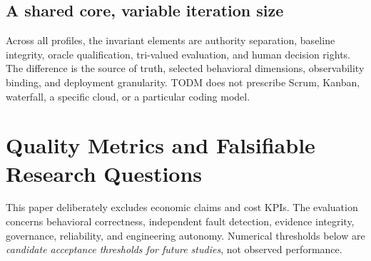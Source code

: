 \documentclass[11pt,a4paper]{article}
\newcommand{\todm}{\textsc{TODM}}
\begin{document}
\subsection{A shared core, variable iteration size}
Across all profiles, the invariant elements are authority separation, baseline integrity, oracle qualification, tri-valued evaluation, and human decision rights. The difference is the source of truth, selected behavioral dimensions, observability binding, and deployment granularity. \todm{} does not prescribe Scrum, Kanban, waterfall, a specific cloud, or a particular coding model.

\section{Quality Metrics and Falsifiable Research Questions}
This paper deliberately excludes economic claims and cost KPIs. The evaluation concerns behavioral correctness, independent fault detection, evidence integrity, governance, reliability, and engineering autonomy. Numerical thresholds below are \emph{candidate acceptance thresholds for future studies}, not observed performance.
\end{document}
